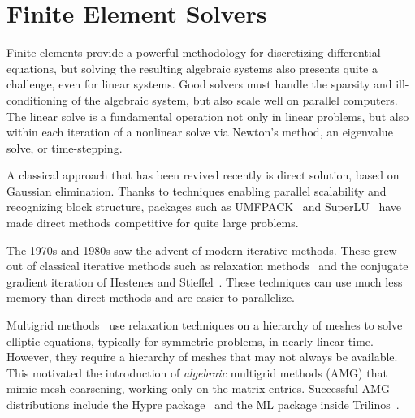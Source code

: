 \section{Finite Element Solvers}

Finite elements provide a powerful methodology for discretizing
differential equations, but solving the resulting algebraic systems
also presents quite a challenge, even for linear systems.  Good
solvers must handle the sparsity and ill-conditioning of the algebraic
system, but also scale well on parallel computers.  The linear solve
is a fundamental operation not only in linear problems, but also
within each iteration of a nonlinear solve via Newton's method, an
eigenvalue solve, or time-stepping.

A classical approach that has been revived recently is direct
solution, based on Gaussian elimination.  Thanks to techniques
enabling parallel scalability and recognizing block structure,
packages such as UMFPACK~\cite{Davis2004} and SuperLU~\cite{Li2005}
have made direct methods competitive for quite large problems.

The 1970s and 1980s saw the advent of modern iterative methods.  These
grew out of classical iterative methods such as relaxation
methods~\cite{missing} and the conjugate gradient iteration of
Hestenes and Stieffel~\cite{HestenesStiefel1952}. These techniques can
use much less memory than direct methods and are easier to
parallelize.


Multigrid methods~\cite{Brandt1977,Wesseling1992} use relaxation
techniques on a hierarchy of meshes to solve elliptic equations,
typically for symmetric problems, in nearly linear time.  However,
they require a hierarchy of meshes that may not always be available.
This motivated the introduction of \emph{algebraic} multigrid methods
(AMG) that mimic mesh coarsening, working only on the matrix entries.
Successful AMG distributions include the Hypre
package~\cite{FalgoutYang2002} and the ML package inside
Trilinos~\cite{HerouxBartlettEtAl2005}.


